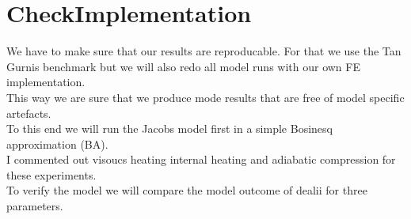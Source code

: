 \section{CheckImplementation}
We have to make sure that our results are reproducable.
For that we use the Tan Gurnis benchmark but we will also redo all model runs with our own FE implementation.\\
This way we are sure that we produce mode results that are free of model specific artefacts.\\
To this end we will run the Jacobs model first in a simple Bosinesq approximation (BA).\\
I commented out visoucs heating internal heating and adiabatic compression for these experiments.\\
To verify the model we will compare the model outcome of dealii for three parameters.
\begin{enumerate}
 \item Root mean square velocity $\int_{Omega} \sqrt{u^{2}+v^{2})/ int_{Omega}$
\item Mean temperature
\item Nusselt Number
\end{enumerate}
